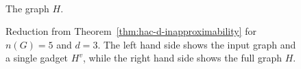\begin{figure}[H]
\begin{minipage}[c][9.5cm][c]{0.58\textwidth}
        \\\smallskip
        {\small The graph $H$.}
    \end{minipage}
    \caption{Reduction from Theorem~\ref{thm:hac-d-inapproximability} for $n(G)=5$ and $d=3$. The left hand side shows the input graph and a single gadget $H^v$, while the right hand side shows the full graph $H$.}
    \label{fig:hardness-diameter-reduction}
\end{figure}
